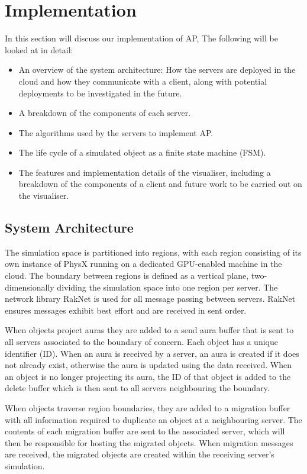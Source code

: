 \chapter{Implementation}
In this section will discuss our implementation of AP, The following will be looked at in detail: \begin{itemize}
	\item An overview of the system architecture: How the servers are deployed in the cloud and how they communicate with a client, along with potential deployments to be investigated in the future.
	\item A breakdown of the components of each server.
	\item The algorithms used by the servers to implement AP.
	\item The life cycle of a simulated object as a finite state machine (FSM).
	\item The features and implementation details of the visualiser, including a breakdown of the components of a client and future work to be carried out on the visualiser.
\end{itemize}


\section{System Architecture}
The simulation space is partitioned into regions, with each region consisting of its own instance of PhysX running on a dedicated GPU-enabled machine in the cloud. The boundary between regions is defined as a vertical plane, two-dimensionally dividing the simulation space into one region per server. The network library RakNet is used for all message passing between servers. RakNet ensures messages exhibit best effort and are received in sent order.

When objects project auras they are added to a send aura buffer that is sent to all servers associated to the boundary of concern. Each object has a unique identifier (ID). When an aura is received by a server, an aura is created if it does not already exist, otherwise the aura is updated using the data received. When an object is no longer projecting its aura, the ID of that object is added to the delete buffer which is then sent to all servers neighbouring the boundary.

When objects traverse region boundaries, they are added to a migration buffer with all information required to duplicate an object at a neighbouring server. The contents of each migration buffer are sent to the associated server, which will then be responsible for hosting the migrated objects. When migration messages are received, the migrated objects are created within the receiving server's simulation.

